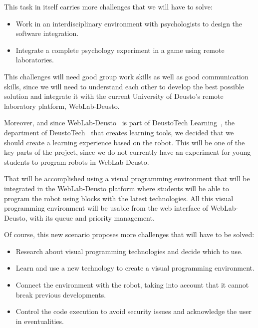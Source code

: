 This task in itself carries more challenges that we will have to solve:

\begin{itemize}

	\item Work in an interdisciplinary environment with psychologists to design the software
	integration.

	\item Integrate a complete psychology experiment in a game using remote laboratories.

\end{itemize}

This challenges will need good group work skills as well as good communication skills, since we will
need to understand each other to develop the best possible solution and integrate it with the
current University of Deusto's remote laboratory platform, WebLab-Deusto.

Moreover, and since WebLab-Deusto~\cite{weblab_web} is part of DeustoTech
Learning~\cite{dtlearning_web}, the department of DeustoTech~\cite{deustotech_web} that creates
learning tools, we decided that we should create a learning experience based on the robot. This will
be one of the key parts of the project, since we do not currently have an experiment for young
students to program robots in WebLab-Deusto.

That will be accomplished using a visual programming environment that will be integrated in the
WebLab-Deusto platform where students will be able to program the robot using blocks with the latest
technologies. All this visual programming environment will be usable from the web interface of
WebLab-Deusto, with its queue and priority management.

Of course, this new scenario proposes more challenges that will have to be solved:

\begin{itemize}
	\item Research about visual programming technologies and decide which to use.

	\item Learn and use a new technology to create a visual programming environment.

	\item Connect the environment with the robot, taking into account that it cannot break previous
	developments.

	\item Control the code execution to avoid security issues and acknowledge the user in
	eventualities.
\end{itemize}

